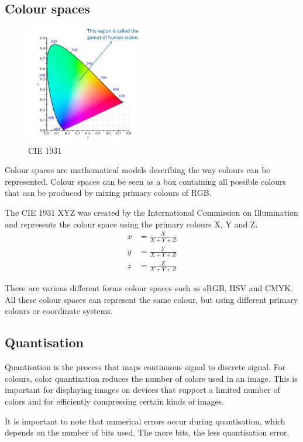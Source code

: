 \documentclass{report}
\begin{document}
\subsection{Colour spaces}

\begin{figure}
    \centering
    \includegraphics[width=5cm]{Colour space repre.JPG}
    \caption{CIE 1931}
\end{figure}

Colour spaces are mathematical models describing the way colours can be
represented. Colour spaces can be seen as a box containing all possible colours that can be
produced by mixing primary colours of RGB. 

The CIE 1931 XYZ was created by the International Commission on Illumination and
represents the colour space using the primary colours X, Y and Z. 
\begin{align*}
    x &= \frac{X}{X+Y+Z} \\
    y &= \frac{Y}{X+Y+Z} \\
    z &= \frac{Z}{X+Y+Z}
\end{align*}

There are various different forms colour spaces such as sRGB, HSV and CMYK.  All
these colour spaces can represent the same colour, but using different
primary colours or coordinate systems.

\subsection{Quantisation}

Quantisation is the process that maps continuous signal to discrete signal. For
colours, color quantization reduces the number of colors used in an image. This
is important for displaying images on devices that support a limited number of
colors and for efficiently compressing certain kinds of images.

It is important to note that numerical errors occur during quantisation,
which depends on the number of bits used. The more bits, the less quantisation
error.
\end{document}
